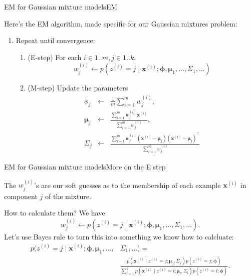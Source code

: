 \documentclass{beamer}
\renewcommand{\vec}[1]{\boldsymbol{#1}}
\newcommand{\mat}[1]{\mathtt{#1}}
\begin{document}
\begin{frame}{EM for Gaussian mixture models}{EM}

  Here's the EM algorithm, made specific for our Gaussian mixtures problem:
  \begin{enumerate}
  \item Repeat until convergence:
    \begin{enumerate}
    \item (E-step) For each $i \in 1..m, j \in 1..k$,
      \[ w_j^{(i)} \leftarrow p(z^{(i)}=j \mid \vec{x}^{(i)};\vec{\phi},\vec{\mu}_1,\ldots,\mat{\Sigma}_1,\ldots) \]
    \item (M-step) Update the parameters
      \begin{eqnarray*}
    \phi_j & \leftarrow & \frac{1}{m} \sum_{i=1}^m w_j^{(i)}, \\
    \vec{\mu}_j & \leftarrow & \frac{\sum_{i=1}^m w_j^{(i)}\vec{x}^{(i)}}{
      \sum_{i=1}^mw_j^{(i)}}, \\
    \mat{\Sigma}_j & \leftarrow & \frac{\sum_{i=1}^m w_j^{(i)}(\vec{x}^{(i)}-\vec{\mu}_j)
      (\vec{x}^{(i)}-\vec{\mu}_j)^\top}{\sum_{i=1}^m w_j^{(i)}}
    \end{eqnarray*}
    \end{enumerate}    
  \end{enumerate}
    
\end{frame}


\begin{frame}{EM for Gaussian mixture models}{More on the E step}

  The $w_j^{(i)}$'s are our soft guesses as to the membership of each
  example $\vec{x}^{(i)}$ in component $j$ of the mixture.

  \medskip

  How to calculate them? We have
  \[ w_j^{(i)} \leftarrow p(z^{(i)}=j \mid \vec{x}^{(i)};\vec{\phi},\vec{\mu}_1,\ldots,\mat{\Sigma}_1,\ldots) .\]
  Let's use Bayes rule to turn this into something we know how to calcluate:
  \begin{align*}
    p(z^{(i)}=j \mid \vec{x}^{(i)};\vec{\phi},\vec{\mu}_1,\ldots,& \mat{\Sigma}_1,\ldots)  = \\
     &\frac{p(\vec{x}^{(i)} \mid z^{(i)} = j ; \vec{\mu}_j,\Sigma_j)
    p(z^{(i)}=j ; \vec{\phi})}{\sum_{l=1}^k p(\vec{x}^{(i)} \mid z^{(i)} = l ; \vec{\mu}_l,\Sigma_l) p(z^{(i)}=l ; \vec{\phi})} .
  \end{align*}

\end{frame}
\end{document}
